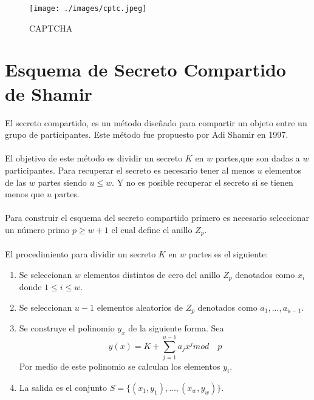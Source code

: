 \begin{figure}[H]
\centering
	\texttt{[image: ./images/cptc.jpeg]}
	\caption{CAPTCHA}
	\label{fig:3-6}
\end{figure}
 




\section{Esquema de Secreto Compartido de Shamir}
El secreto compartido, es un método dise\~nado para compartir un objeto entre un grupo de participantes. Este método fue propuesto por Adi Shamir en 1997.\cite{shamir}
\\
\\
El objetivo de este método es dividir un secreto $K$ en $w$ partes,que son dadas a $w$ participantes. Para recuperar el secreto es necesario tener al menos $u$
elementos de las $w$ partes siendo $u \leq w$. Y no es posible recuperar el secreto si se tienen menos que $u$ partes.
\\
\\
Para construir el esquema del secreto compartido primero es necesario seleccionar un número primo $p \geq w+1$ el cual define el anillo $Z_p$.
\\
\\
El procedimiento para dividir un secreto $K$ en $w$ partes es el siguiente:

\begin{enumerate}
 \item Se seleccionan $w$ elementos distintos de cero del anillo $Z_p$ denotados como $x_i$ donde $1 \leq i \leq w$.
 \item Se seleccionan $u-1$ elementos aleatorios de $Z_p$ denotados como $a_1,...,a_{u-1}$.
 \item Se construye el polinomio $y_x$ de la siguiente forma. Sea \begin{equation}
            y(x)=K+\sum_{j=1}^{u-1} a_j x^j mod \quad p
           \end{equation}
           Por medio de este polinomio se calculan los elementos $y_i$.
 \item La salida es el conjunto $S=\{(x_1,y_1),...,(x_w,y_w)\}$.
\end{enumerate}

